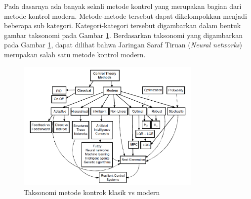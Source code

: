 Pada dasarnya ada banyak sekali metode kontrol yang merupakan bagian dari metode kontrol modern. Metode-metode tersebut dapat dikelompokkan menjadi beberapa sub kategori. Kategori-kategori tersebut digambarkan dalam bentuk gambar taksonomi pada Gambar \ref{fig:3:ControlSystemTaxonomy}. Berdasarkan taksonomi yang digambarkan pada Gambar \ref{fig:3:ControlSystemTaxonomy}, dapat dilihat bahwa Jaringan Saraf Tiruan (\textit{Neural networks}) merupakan salah satu metode kontrol modern.

\begin{figure}[!h]
	\centering
	\includegraphics[width=0.8\textwidth]{figures/ControlSystemTaxonomy}
	\caption{Taksonomi metode kontrok klasik vs modern \cite{MPCDissertation}}
	\label{fig:3:ControlSystemTaxonomy}
\end{figure}